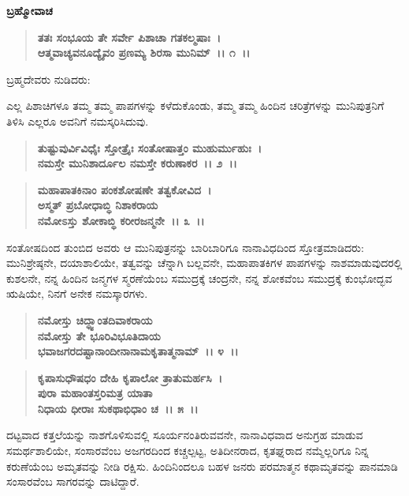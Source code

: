 \begin{flushleft}
\textbf{ಬ್ರಹ್ಮೋವಾಚ\enginline{-}}
\end{flushleft}

\begin{verse}
\textbf{ತತಃ ಸಂಭೂಯ ತೇ ಸರ್ವೇ ಪಿಶಾಚಾ ಗತಕಲ್ಮಷಾಃ~।}\\\textbf{ಆತ್ಮವಾಚ್ಯವನೂದ್ಯೈವಂ ಪ್ರಣಮ್ಯ ಶಿರಸಾ ಮುನಿಮ್~।। ೧~।।}
\end{verse}

\begin{flushleft}
ಬ್ರಹ್ಮದೇವರು ನುಡಿದರು:
\end{flushleft}

ಎಲ್ಲ ಪಿಶಾಚಿಗಳೂ ತಮ್ಮ ತಮ್ಮ ಪಾಪಗಳನ್ನು ಕಳೆದುಕೊಂಡು, ತಮ್ಮ ತಮ್ಮ ಹಿಂದಿನ ಚರಿತ್ರೆಗಳನ್ನು ಮುನಿಪುತ್ರನಿಗೆ ತಿಳಿಸಿ ಎಲ್ಲರೂ ಅವನಿಗೆ ನಮಸ್ಕರಿಸಿದುವು.

\begin{verse}
\textbf{ತುಷ್ಟುವುರ್ವಿವಿಧೈಃ ಸ್ತೋತ್ರೈಃ ಸಂತೋಷಾತ್ತಂ ಮುಹುರ್ಮುಹುಃ~।}\\\textbf{ನಮಸ್ತೇ ಮುನಿಶಾರ್ದೂಲ ನಮಸ್ತೇ ಕರುಣಾಕರ~।। ೨~।। }
\end{verse}

\begin{verse}
\textbf{ಮಹಾಪಾತಕಿನಾಂ ಪಂಕಶೋಷಣೇ ತತ್ವಕೋವಿದ~।}\\\textbf{ಅಸ್ಮತ್ ಪ್ರಬೋಧಾಬ್ಧಿ ನಿಶಾಕರಾಯ} \\\textbf{ನಮೋಽಸ್ತು ಶೋಕಾಬ್ಧಿ ಕರೀರಜನ್ಮನೇ~।। ೩~।।}
\end{verse}

ಸಂತೋಷದಿಂದ ತುಂಬಿದ ಅವರು ಆ ಮುನಿಪುತ್ರನನ್ನು ಬಾರಿಬಾರಿಗೂ ನಾನಾವಿಧದಿಂದ ಸ್ತೋತ್ರಮಾಡಿದರು: ಮುನಿಶ್ರೇಷ್ಠನೇ, ದಯಾಶಾಲಿಯೇ, ತತ್ವವನ್ನು ಚೆನ್ನಾಗಿ ಬಲ್ಲವನೇ, ಮಹಾಪಾತಕಿಗಳ ಪಾಪಗಳನ್ನು ನಾಶಮಾಡುವುದರಲ್ಲಿ ಕುಶಲನೇ, ನನ್ನ ಹಿಂದಿನ ಜನ್ಮಗಳ ಸ್ಮರಣೆಯೆಂಬ ಸಮುದ್ರಕ್ಕೆ ಚಂದ್ರನೇ, ನನ್ನ ಶೋಕವೆಂಬ ಸಮುದ್ರಕ್ಕೆ ಕುಂಭೋದ್ಭವ ಋಷಿಯೇ, ನಿನಗೆ ಅನೇಕ ನಮಸ್ಕಾರಗಳು.

\begin{verse}
\textbf{ನಮೋಸ್ತು ಚಿದ್ಧ್ವಾಂತದಿವಾಕರಾಯ} \\\textbf{ನಮೋಸ್ತು ತೇ ಭೂರಿವಿಭೂತಿದಾಯ}\\\textbf{ಭವಾಜಗರದಷ್ಟಾನಾಂದೀನಾನಾಮಕೃತಾತ್ಮನಾಮ್~।। ೪~।।} 
\end{verse}

\begin{verse}
\textbf{ಕೃಪಾಸುಧೌಷಧಂ ದೇಹಿ ಕೃಪಾಲೋ ತ್ರಾತುಮರ್ಹಸಿ~।}\\\textbf{ಪುರಾ ಮಹಾಂತಸ್ತರಿಮತ್ರ ಯಾತಾ}\\\textbf{ನಿಧಾಯ ಧೀರಾಃ ಸುಕಥಾಭಿಧಾಂ ಚ~।। ೫~।।}
\end{verse}

ದಟ್ಟವಾದ ಕತ್ತಲೆಯನ್ನು ನಾಶಗೊಳಿಸುವಲ್ಲಿ ಸೂರ್ಯನಂತಿರುವವನೇ, ನಾನಾವಿಧವಾದ ಅನುಗ್ರಹ ಮಾಡುವ ಸಮರ್ಥಶಾಲಿಯೇ, ಸಂಸಾರವೆಂಬ ಅಜಗರದಿಂದ ಕಚ್ಚಲ್ಪಟ್ಟ, ಅತಿ\-ದೀನರಾದ, ಕೃತಘ್ನರಾದ ನಮ್ಮೆಲ್ಲರಿಗೂ ನಿನ್ನ ಕರುಣೆಯೆಂಬ ಅಮೃತವನ್ನು ನೀಡಿ ರಕ್ಷಿಸು. ಹಿಂದಿನಿಂದಲೂ ಬಹಳ ಜನರು ಪರಮಾತ್ಮನ ಕಥಾಮೃತವನ್ನು ಪಾನಮಾಡಿ ಸಂಸಾರವೆಂಬ ಸಾಗರವನ್ನು ದಾಟಿದ್ದಾರೆ.

